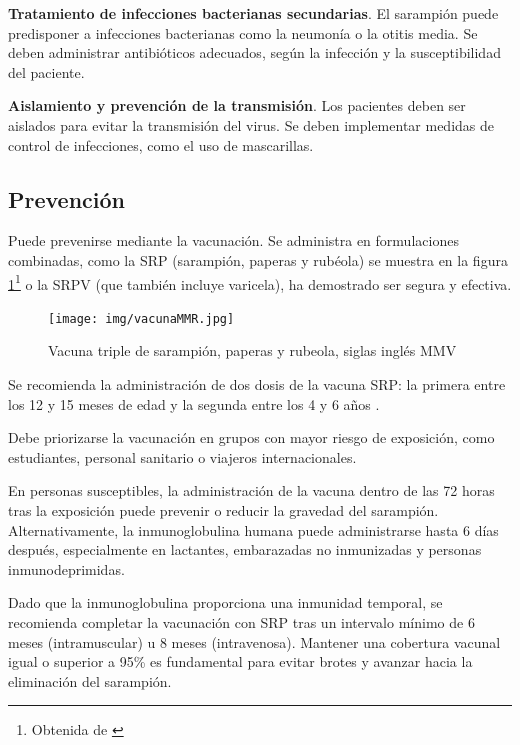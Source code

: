 \textbf{Tratamiento de infecciones bacterianas secundarias}.
El sarampión puede predisponer a infecciones bacterianas como la neumonía o la otitis media. Se deben administrar antibióticos adecuados, según la infección y la susceptibilidad del paciente.

\textbf{Aislamiento y prevención de la transmisión}.
Los pacientes deben ser aislados para evitar la transmisión del virus. Se deben implementar medidas de control de infecciones, como el uso de mascarillas.

\subsection{Prevención}
Puede prevenirse mediante la vacunación. Se administra en formulaciones combinadas, como la SRP (sarampión, paperas y rubéola) se muestra en la figura \ref{fig:vacuna sarampión}\footnote{Obtenida de \cite{aarp_sarampion_2019}} o la SRPV (que también incluye varicela), ha demostrado ser segura y efectiva.

\begin{figure}[H]
        \centering
        \texttt{[image: img/vacunaMMR.jpg]}
        \caption{Vacuna triple de sarampión, paperas y rubeola, siglas inglés MMV}
        \label{fig:vacuna sarampión}
        \vspace{0.5cm} %
\end{figure}

Se recomienda la administración de dos dosis de la vacuna SRP: la primera entre los 12 y 15 meses de edad y la segunda entre los 4 y 6 años \cite{gastanaduy2021measles}. 

Debe priorizarse la vacunación en grupos con mayor riesgo de exposición, como estudiantes, personal sanitario o viajeros internacionales.

En personas susceptibles, la administración de la vacuna dentro de las 72 horas tras la exposición puede prevenir o reducir la gravedad del sarampión. Alternativamente, la inmunoglobulina humana puede administrarse hasta 6 días después, especialmente en lactantes, embarazadas no inmunizadas y personas inmunodeprimidas.

Dado que la inmunoglobulina proporciona una inmunidad temporal, se recomienda completar la vacunación con SRP tras un intervalo mínimo de 6 meses (intramuscular) u 8 meses (intravenosa). Mantener una cobertura vacunal igual o superior a 95\% es fundamental para evitar brotes y avanzar hacia la eliminación del sarampión.

